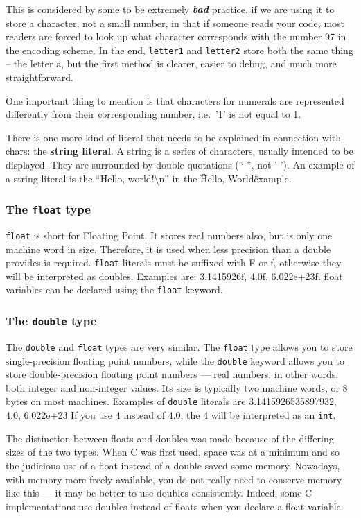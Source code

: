 This is considered by some to be extremely \textbf{\emph{bad}} practice, if we
are using it to store a character, not a small number, in that if someone reads
your code, most readers are forced to look up what character corresponds with
the number 97 in the encoding scheme. In the end, \texttt{letter1} and
\texttt{letter2} store both the same thing -- the letter a, but the first
method is clearer, easier to debug, and much more straightforward. 

One important thing to mention is that characters for numerals are represented
differently from their corresponding number, i.e.\ '1' is not equal to 1. 

There is one more kind of literal that needs to be explained in connection with
chars: the \textbf{string literal}. A string is a series of characters, usually
intended to be displayed. They are surrounded by double quotations (`` '', not
' '). An example of a string literal is the ``Hello, world!\textbackslash{}n''
in the \"Hello, World\" example.

\subsubsection{The \texttt{float} type}
\texttt{float} is short for Floating Point. It stores real numbers also, but is
only one machine word in size. Therefore, it is used when less precision than a
double provides is required. \texttt{float} literals must be suffixed with F or
f, otherwise they will be interpreted as doubles. Examples are: 3.1415926f,
4.0f, 6.022e+23f. float variables can be declared using the \texttt{float}
keyword.

\subsubsection{The \texttt{double} type}
The \texttt{double} and \texttt{float} types are very similar. The
\texttt{float} type allows you to store single-precision floating point
numbers, while the \texttt{double} keyword allows you to store double-precision
floating point numbers --- real numbers, in other words, both integer and
non-integer values. Its size is typically two machine words, or 8 bytes on most
machines. Examples of \texttt{double} literals are 3.1415926535897932, 4.0,
6.022e+23 
If you use 4 instead of 4.0, the 4 will be interpreted as an
\texttt{int}.

The distinction between floats and doubles was made because of the differing
sizes of the two types. When C was first used, space was at a minimum and so
the judicious use of a float instead of a double saved some memory. Nowadays,
with memory more freely available, you do not really need to conserve memory
like this --- it may be better to use doubles consistently. Indeed, some C
implementations use doubles instead of floats when you declare a float
variable.

